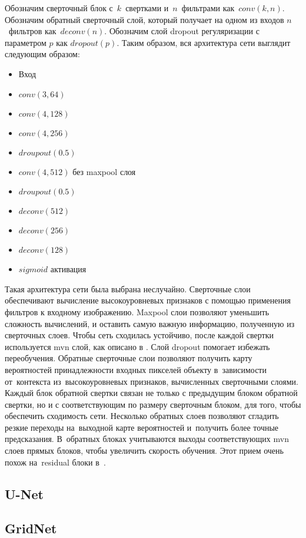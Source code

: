 Обозначим сверточный блок с~$k$~свертками и~$n$~фильтрами как~$conv(k,n)$. Обозначим обратный сверточный слой, который получает на одном из входов $n$~фильтров как~$deconv(n)$. Обозначим слой dropout регуляризации с параметром $p$ как $dropout(p)$. Таким образом, вся архитектура сети выглядит следующим образом:

\begin{itemize}
  \item Вход
  \item $conv(3,64)$
  \item $conv(4,128)$
  \item $conv(4,256)$
  \item $droupout(0.5)$
  \item $conv(4,512)$ без maxpool слоя
  \item $droupout(0.5)$
  \item $deconv(512)$
  \item $deconv(256)$
  \item $deconv(128)$
  \item $sigmoid$ активация
\end{itemize}

Такая архитектура сети была выбрана неслучайно. Сверточные слои обеспечивают вычисление высокоуровневых признаков с помощью применения фильтров к входному изображению. Maxpool слои позволяют уменьшить сложность вычислений, и оставить самую важную информацию, полученную из сверточных слоев. Чтобы сеть сходилась устойчиво, после каждой свертки используется mvn слой, как описано в \cite{batch_norm}. Слой dropout помогает избежать переобучения. Обратные сверточные слои позволяют получить карту вероятностей принадлежности входных пикселей объекту в~зависимости от~контекста из~высокоуровневых признаков, вычисленных сверточными слоями. Каждый блок обратной свертки связан не только с предыдущим блоком обратной свертки, но и с соответствующим по размеру сверточным блоком, для того, чтобы обеспечить сходимость сети. Несколько обратных слоев позволяют сгладить резкие переходы на~выходной карте вероятностей и~получить более точные предсказания. В~обратных блоках учитываются выходы соответствующих mvn слоев прямых блоков, чтобы увеличить скорость обучения. Этот прием очень похож на~residual блоки в~\cite{resnet}.

\subsection{U-Net}

\subsection{GridNet}
